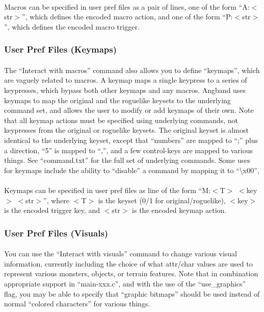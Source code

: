 \paragraph{}Macros can be specified in user pref files as a pair of
lines, one of the form ``A:$<$str$>$'', which defines the encoded macro
action, and one of the form ``P:$<$str$>$'', which defines the encoded macro
trigger.

\subsubsection{User Pref Files (Keymaps)} 
\paragraph{}The ``Interact with macros'' command also allows you to
define ``keymaps'', which are vaguely related to macros. A keymap maps a
single keypress to a series of keypresses, which bypass both other
keymaps and any macros. Angband uses keymaps to map the original and the
roguelike keysets to the underlying command set, and allows the user to
modify or add keymaps of their own. Note that all keymap actions must be
specified using underlying commands, not keypresses from the original or
roguelike keysets. The original keyset is almost identical to the
underlying keyset, except that ``numbers'' are mapped to ``;'' plus a
direction, ``5'' is mapped to ``,'', and a few control-keys are mapped
to various things. See ``command.txt'' for the full set of underlying
commands.  Some uses for keymaps include the ability to ``disable'' a
command by mapping it to ``\textbackslash x00'',

\paragraph{}Keymaps can be specified in user pref files as line of the
form ``M:$<$T$>$ $<$key$>$ $<$str$>$'', where $<$T$>$ is the keyset (0/1
for original/roguelike), $<$key$>$ is the encoded trigger key, and
$<$str$>$ is the encoded keymap action.

\subsubsection{User Pref Files (Visuals)}
\paragraph{}You can use the ``Interact with visuals'' command to change
various visual information, currently including the choice of what
attr/char values are used to represent various monsters, objects, or
terrain features. Note that in combination appropriate support in
``main-xxx.c'', and with the use of the ``use\_graphics'' flag, you may
be able to specify that ``graphic bitmaps'' should be used instead of
normal ``colored characters'' for various things.

